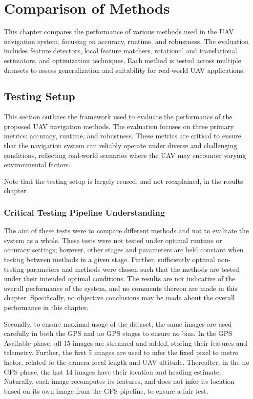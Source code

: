 \chapter{Comparison of Methods}

This chapter compares the performance of various methods used in the UAV navigation system, focusing on accuracy, runtime, and robustness. The evaluation includes feature detectors, local feature matchers, rotational and translational estimators, and optimization techniques. Each method is tested across multiple datasets to assess generalization and suitability for real-world UAV applications.

\section{Testing Setup}

This section outlines the framework used to evaluate the performance of the proposed UAV navigation methods. The evaluation focuses on three primary metrics: accuracy, runtime, and robustness. These metrics are critical to ensure that the navigation system can reliably operate under diverse and challenging conditions, reflecting real-world scenarios where the UAV may encounter varying environmental factors.

Note that the testing setup is largely reused, and not reexplained, in the results chapter. 


\subsection{Critical Testing Pipeline Understanding}
The aim of these tests were to compare different methods and not to evaluate the system as a whole. These tests were not tested under optimal runtime or accuracy settings; however, other stages and parameters are held constant when testing between methods in a given stage. Further, sufficiently optimal non-testing parameters and methods were chosen such that the methods are tested under their intended optimal conditions. The results are not indicative of the overall performance of the system, and no comments thereon are made in this chapter. Specifically, no objective conclusions may be made about the overall performance in this chapter. 

Secondly, to ensure maximal usage of the dataset, the same images are used carefully in both the GPS and no GPS stages to ensure no bias. In the GPS Available phase, all 15 images are streamed and added, storing their features and telemetry. Further, the first 5 images are used to infer the fixed pixel to metre factor, related to the camera focal length and UAV altitude. Thereafter, in the no GPS phase, the last 14 images have their location and heading estimate. Naturally, each image recomputes its features, and does not infer its location based on its own image from the GPS pipeline, to ensure a fair test. 


